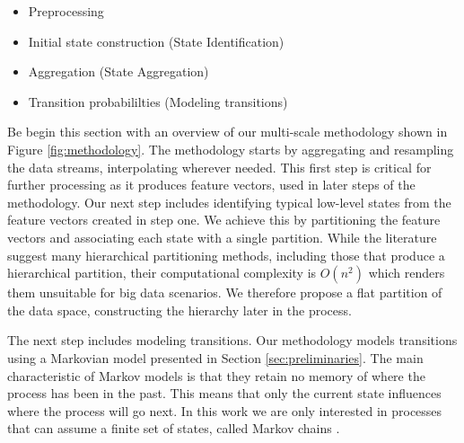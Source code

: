 \begin{itemize}
	\item Preprocessing
	\item Initial state construction (State Identification)
	\item Aggregation (State Aggregation)
	\item Transition probabililties (Modeling transitions)
\end{itemize}

Be begin this section with an overview of our multi-scale methodology shown in Figure \ref{fig:methodology}.
The methodology starts by aggregating and resampling the data streams, interpolating wherever needed. This
first step is critical for further processing as it produces feature vectors, used in later steps of the
methodology. Our next step includes identifying typical low-level states from the feature vectors
created in step one. We achieve this by partitioning the feature vectors and associating each state
with a single partition. While the literature suggest many hierarchical partitioning methods, including
those that produce a hierarchical partition, their computational complexity is $O(n^2)$ which
renders them unsuitable for big data scenarios. We therefore propose a flat partition of the data space,
constructing the hierarchy later in the process.

The next step includes modeling transitions. Our methodology models transitions using a Markovian model
presented in Section \ref{sec:preliminaries}. The main characteristic of Markov models is that they
retain no memory of where the process has been in the past. This means that only the current state
influences where the process will go next. In this work we are only interested in processes that
can assume a finite set of states, called Markov chains \cite{norris1998markov}.